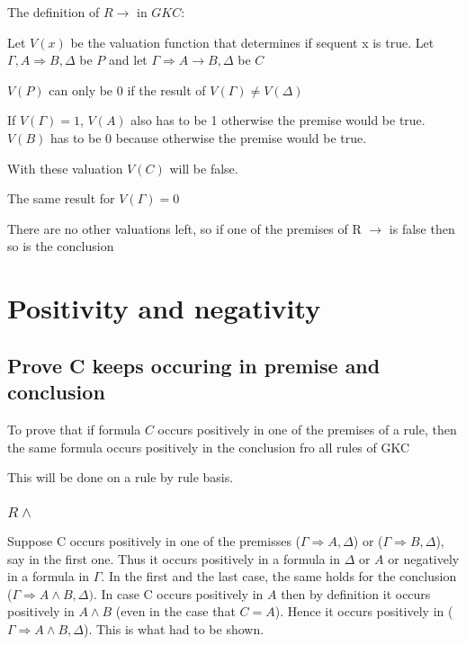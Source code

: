 \documentclass{article}
\newenvironment{scprooftree}[1]%
{\gdef\scalefactor{#1}\begin{center}\proofSkipAmount \leavevmode}%
{\scalebox{\scalefactor}{\DisplayProof}\proofSkipAmount \end{center} }
\begin{document}
The definition of $R\to$ in $GKC$:

\begin{scprooftree}{1}
\end{scprooftree}
Let $V(x)$ be the valuation function that determines if sequent x
is true.
Let $\Gamma, A \Rightarrow B, \Delta$ be $P$ and
let $\Gamma \Rightarrow A \to B, \Delta$ be $C$


$V(P)$ can only be 0 if the result of
$V(\Gamma) \not= V(\Delta)$

If $V(\Gamma) = 1$, $V(A)$ also has to be 1 otherwise the premise would be true.
$V(B)$ has to be 0 because otherwise the premise would be true.

With these valuation $V(C)$ will be false.

The same result for $V(\Gamma) = 0$

There are no other valuations left, so if one of the premises of R $\to$ is
false then so is the conclusion


\section{Positivity and negativity}
\subsection{Prove C keeps occuring in premise and conclusion}
To prove that if formula $C$ occurs positively in one of the premises of a rule,
then the same formula occurs positively in the conclusion fro all rules of GKC

This will be done on a rule by rule basis.
\subsubsection{$R\wedge$}
Suppose C occurs positively in one of the premisses
($\Gamma \Rightarrow A, \Delta$) or ($\Gamma \Rightarrow B,\Delta$),
say in the first one. Thus it occurs positively in a formula in $\Delta$ or
$A$ or negatively in a formula in $\Gamma$. In the first and the last case,
the same holds for the conclusion ($\Gamma \Rightarrow A \wedge B, \Delta)$.
In case C occurs positively in $A$ then by definition it occurs positively
in $A \wedge B$ (even in the case that $C = A$). Hence it occurs positively
in ($\Gamma \Rightarrow A \wedge B, \Delta$). This is what had to be shown.
\end{document}
